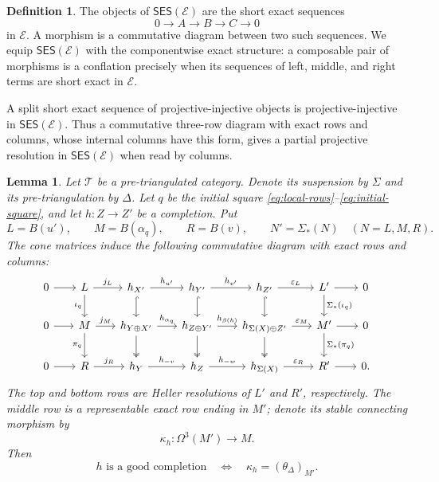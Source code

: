 \documentclass[a4paper,11pt,reqno]{amsart}
\newtheorem{lemma}[lemma]{Lemma}
\theoremstyle{definition}
\newtheorem{definition}[definition]{Definition}
\theoremstyle{plain}
\numberwithin{equation}{section}
\newcommand{\T}{\mathcal T}
\begin{document}
\begin{definition}
\label{def:ses-category}
The objects of \(\mathsf{SES}(\mathcal E)\) are the short exact sequences
\[
 0\longrightarrow A\longrightarrow B\longrightarrow C\longrightarrow0
\]
in \(\mathcal E\).  A morphism is a commutative diagram between two such
sequences.  We equip \(\mathsf{SES}(\mathcal E)\) with the componentwise
exact structure: a composable pair of morphisms is a conflation precisely
when its sequences of left, middle, and right terms are short exact in
\(\mathcal E\).
\end{definition}

A split short exact sequence of projective-injective objects is
projective-injective in \(\mathsf{SES}(\mathcal E)\).  Thus a commutative
three-row diagram with exact rows and columns, whose internal columns have
this form, gives a partial projective resolution in
\(\mathsf{SES}(\mathcal E)\) when read by columns.

\begin{lemma}
\label{lem:standard-three-row}
Let \(\T\) be a pre-triangulated category.  Denote its suspension by
\(\Sigma\) and its pre-triangulation by \(\Delta\).  Let \(q\) be the initial square
\eqref{eq:local-rows}--\eqref{eq:initial-square}, and let
\(h:Z\to Z'\) be a completion.  Put
\[
 L=B(u'),\qquad M=B(\alpha_q),\qquad R=B(v),
 \qquad N'=\Sigma_*(N)\quad(N=L,M,R).
\]
The cone matrices induce the following commutative diagram with exact rows
and columns:
\begin{equation}
\label{eq:standard-heller-square}
\begin{tikzcd}[column sep=1.8em,row sep=1.8em]
0 \arrow[r] &
 L \arrow[r,"j_L"] \arrow[d,"\iota_q"'] &
 h_{X'} \arrow[r,"h_{u'}"] \arrow[d,hook] &
 h_{Y'} \arrow[r,"h_{v'}"] \arrow[d,hook] &
 h_{Z'} \arrow[r,"\varepsilon_L"] \arrow[d,hook] &
 L' \arrow[r] \arrow[d,"\Sigma_*(\iota_q)"] &0\\
0 \arrow[r] &
 M \arrow[r,"j_M"] \arrow[d,"\pi_q"'] &
 h_{Y\oplus X'} \arrow[r,"h_{\alpha_q}"] \arrow[d,two heads] &
 h_{Z\oplus Y'} \arrow[r,"h_{\beta(h)}"] \arrow[d,two heads] &
 h_{\Sigma(X)\oplus Z'} \arrow[r,"\varepsilon_M"] \arrow[d,two heads] &
 M' \arrow[r] \arrow[d,"\Sigma_*(\pi_q)"] &0\\
0 \arrow[r] &
 R \arrow[r,"j_R"] & h_Y \arrow[r,"h_{-v}"] &
 h_Z \arrow[r,"h_{-w}"] & h_{\Sigma(X)} \arrow[r,"\varepsilon_R"] &
 R' \arrow[r] &0.
\end{tikzcd}
\end{equation}
The top and bottom rows are Heller resolutions of \(L'\) and \(R'\),
respectively.
The middle row is a representable exact row ending in \(M'\); denote its
stable connecting morphism by
\[
 \kappa_h:\Omega^3(M')\longrightarrow M.
\]
Then
\begin{equation}
\label{eq:middle-row-recognition}
 h\text{ is a good completion}
 \quad\Longleftrightarrow\quad
 \kappa_h=(\theta_\Delta)_{M'}.
\end{equation}
\end{lemma}
\end{document}
